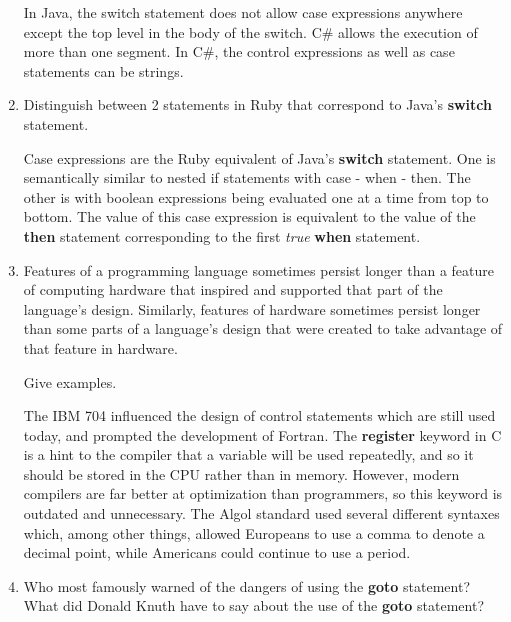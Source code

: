 \begin{enumerate}
\begin{answer}
  	In Java, the switch statement does not allow case expressions anywhere except the top level in the body of the switch.  C\#  allows the execution of more than one segment. In C\#, the control expressions as well as case statements can be strings.

  \end{answer}

  \item Distinguish between 2 statements in Ruby
    that correspond to Java's \textbf{switch} statement.

  \begin{answer}

  	Case expressions are the Ruby equivalent of Java's \textbf{switch} statement. One is semantically similar to nested if statements with case - when - then. The other is with boolean expressions being evaluated one at a time from top to bottom. The value of this case expression is equivalent to the value of the \textbf{then} statement corresponding to the first \textit{true} \textbf{when} statement.

  \end{answer}

  \item Features of a programming language sometimes persist
    longer than a feature of computing hardware that inspired
    and supported that part of the language's design.
    Similarly, features of hardware sometimes persist longer
    than some parts of a language's design that were created
    to take advantage of that feature in hardware.

    Give examples.

  \begin{answer}

    The IBM 704 influenced the design of control statements which are still used today, and prompted the development of Fortran.
    The \textbf{register} keyword in C is a hint to the compiler that a variable will be used repeatedly, and so it should be stored in the CPU rather than in memory. However, modern compilers are far better at optimization than programmers, so this keyword is outdated and unnecessary.
    The Algol standard used several different syntaxes which, among other things, allowed Europeans to use a comma to denote a decimal point, while Americans could continue to use a period.

  \end{answer}

  \item Who most famously warned of the dangers of using the
    \textbf{goto} statement? What did Donald Knuth have to
    say about the use of the \textbf{goto} statement?


\end{enumerate}
